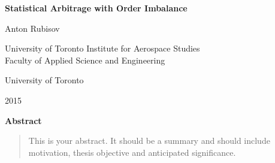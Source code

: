 \vspace*{0.25in}

\begin{center}
	{\Large\bf Statistical Arbitrage with Order Imbalance \par}
	{\large Anton Rubisov \par}
	{University of Toronto Institute for Aerospace Studies}\\
    {Faculty of Applied Science and Engineering}\\
	{University of Toronto \par}
	{2015}
\end{center}
\vspace{0.25in}	
{\Large\bf Abstract}
\vspace{0.25in}

\begin{quote}
	This is your abstract.  It should be a summary and should include
	motivation, thesis objective and anticipated significance.
\end{quote}